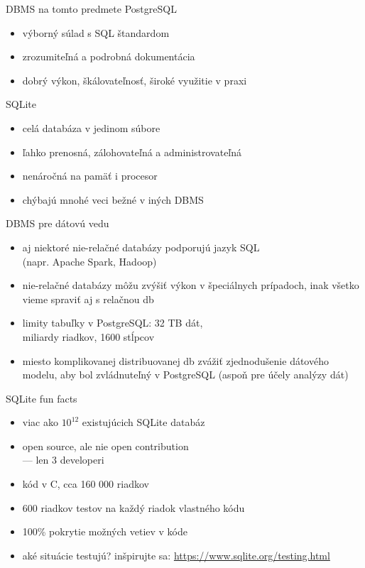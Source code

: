\documentclass[12pt]{beamer}
\begin{document}
\begin{frame}{DBMS na tomto predmete}
PostgreSQL
\begin{itemize}
\item výborný súlad s SQL štandardom
\item zrozumiteľná a podrobná dokumentácia
\item dobrý výkon, škálovateľnosť, široké využitie v praxi
\end{itemize}
\bigskip

SQLite
\begin{itemize}
\item celá databáza v jedinom súbore
\item ľahko prenosná, zálohovateľná a administrovateľná
\item nenáročná na pamäť i procesor
\item chýbajú mnohé veci bežné v iných DBMS
\end{itemize}
\end{frame}

\begin{frame}{DBMS pre dátovú vedu}
\begin{itemize}
\item aj niektoré nie-relačné databázy podporujú jazyk SQL\\
    (napr. Apache Spark, Hadoop)
\item nie-relačné databázy môžu zvýšiť výkon v špeciálnych prípadoch, inak všetko vieme spraviť aj s relačnou db
\item limity tabuľky v PostgreSQL: 32 TB dát,\\ miliardy riadkov, 1600 stĺpcov
\item miesto komplikovanej distribuovanej db zvážiť zjednodušenie dátového modelu, aby bol zvládnuteľný v PostgreSQL (aspoň pre účely analýzy dát)
\end{itemize}
\end{frame}

\begin{frame}{SQLite fun facts}
\begin{itemize}
\item viac ako $10^{12}$ existujúcich SQLite databáz
\item open source, ale nie open contribution\\ --- len 3 developeri
\item kód v C, cca 160 000 riadkov
\item 600 riadkov testov na každý riadok vlastného kódu
\item 100\% pokrytie možných vetiev v kóde
\item aké situácie testujú? inšpirujte sa: \url{https://www.sqlite.org/testing.html}
\end{itemize}
\end{frame}
\end{document}
